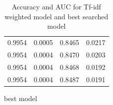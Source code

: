 \begin{table}
\begin{subtable}{.5\linewidth}
\begin{tabular}{cccc}
      0.9954          & 0.0005        & 0.8465          & 0.0217 \\
      0.9954          & 0.0004        & 0.8470          & 0.0203 \\
      0.9954          & 0.0004        & 0.8468          & 0.0192 \\
      0.9954          & 0.0004        & 0.8487          & 0.0191 \\ \bottomrule
    \end{tabular}
      \caption{best model}
      \label{tab:best-model}
  \end{subtable}
\caption{Accuracy and AUC for Tf-idf weighted model and best searched model}
\label{tab:tfidf-gridsearch-data-tables}
\end{table}

